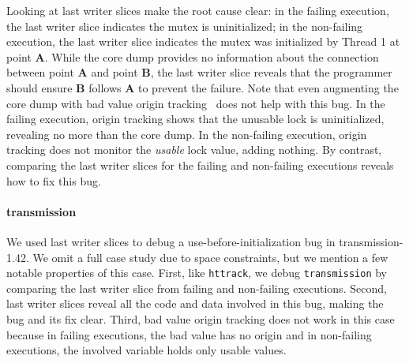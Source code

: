 \documentclass[pageno,nohyperref]{jpaper}
\begin{document}
Looking at last writer slices make the root cause clear: in the failing
execution, the last writer slice indicates the mutex is uninitialized; in the
non-failing execution, the last writer slice indicates the mutex was
initialized by Thread 1 at point {\bf A}. While the core dump provides no
information about the connection between point {\bf A} and point {\bf B}, the
last writer slice reveals that the programmer should ensure {\bf B} follows
{\bf A} to prevent the failure.  Note that even augmenting the core dump with
bad value origin tracking~\cite{badapples} does not help with this bug.  In the
failing execution, origin tracking shows that the unusable lock is
uninitialized, revealing no more than the core dump.  In the non-failing
execution, origin tracking does not monitor the {\em usable} lock value, adding
nothing.  By contrast, comparing the last writer slices for the failing and
non-failing executions reveals how to fix this bug.  


\paragraph{transmission} We used last writer slices to debug a
use-before-initialization bug in transmission-1.42.  We omit a full case study
due to space constraints, but we mention a few notable properties of this case.
First, like {\tt httrack}, we debug {\tt transmission} by comparing the last
writer slice from failing and non-failing executions.  Second, last writer
slices reveal all the code and data involved in this bug, making the bug and
its fix clear.   Third, bad value origin tracking does not work in this case
because in failing executions, the bad value has no origin and in non-failing
executions, the involved variable holds only usable values.

%
%
\end{document}
